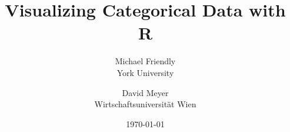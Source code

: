 %
\title{%
\Huge{Visualizing Categorical Data with R} 
%
%
}
\author{
	{\Large Michael Friendly} \\ York University
	\and
	{\Large David Meyer} \\ Wirtschaftsuniversit\"at Wien
}
\date{\today}
\vspace{1cm}
\maketitle
